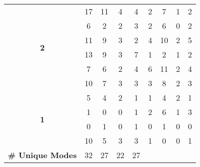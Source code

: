 \begin{table}[!htbp]
\begin{adjustbox}{angle=90}
\begin{tabular}{ccccccccc}
			\multicolumn{1}{c|}{\multirow{6}{*}{\textbf{2}}} & \multicolumn{1}{c|}{17} & \multicolumn{1}{c|}{11} & \multicolumn{1}{c|}{4} & \multicolumn{1}{c|}{4} & \multicolumn{1}{c|}{2} & \multicolumn{1}{c|}{7} & \multicolumn{1}{c|}{1} & 2 \\
			\multicolumn{1}{c|}{} & \multicolumn{1}{c|}{6} & \multicolumn{1}{c|}{2} & \multicolumn{1}{c|}{2} & \multicolumn{1}{c|}{3} & \multicolumn{1}{c|}{2} & \multicolumn{1}{c|}{6} & \multicolumn{1}{c|}{0} & 2 \\
			\multicolumn{1}{c|}{} & \multicolumn{1}{c|}{11} & \multicolumn{1}{c|}{9} & \multicolumn{1}{c|}{3} & \multicolumn{1}{c|}{2} & \multicolumn{1}{c|}{4} & \multicolumn{1}{c|}{10} & \multicolumn{1}{c|}{2} & 5 \\
			\multicolumn{1}{c|}{} & \multicolumn{1}{c|}{13} & \multicolumn{1}{c|}{9} & \multicolumn{1}{c|}{3} & \multicolumn{1}{c|}{7} & \multicolumn{1}{c|}{1} & \multicolumn{1}{c|}{2} & \multicolumn{1}{c|}{1} & 2 \\
			\multicolumn{1}{c|}{} & \multicolumn{1}{c|}{7} & \multicolumn{1}{c|}{6} & \multicolumn{1}{c|}{2} & \multicolumn{1}{c|}{4} & \multicolumn{1}{c|}{6} & \multicolumn{1}{c|}{11} & \multicolumn{1}{c|}{2} & 4 \\
			\multicolumn{1}{c|}{} & \multicolumn{1}{c|}{10} & \multicolumn{1}{c|}{7} & \multicolumn{1}{c|}{3} & \multicolumn{1}{c|}{3} & \multicolumn{1}{c|}{3} & \multicolumn{1}{c|}{8} & \multicolumn{1}{c|}{2} & 3 \\ \hline
			\multicolumn{1}{c|}{\multirow{4}{*}{\textbf{1}}} & \multicolumn{1}{c|}{5} & \multicolumn{1}{c|}{4} & \multicolumn{1}{c|}{2} & \multicolumn{1}{c|}{1} & \multicolumn{1}{c|}{1} & \multicolumn{1}{c|}{4} & \multicolumn{1}{c|}{2} & 1 \\
			\multicolumn{1}{c|}{} & \multicolumn{1}{c|}{1} & \multicolumn{1}{c|}{0} & \multicolumn{1}{c|}{0} & \multicolumn{1}{c|}{1} & \multicolumn{1}{c|}{2} & \multicolumn{1}{c|}{6} & \multicolumn{1}{c|}{1} & 3 \\
			\multicolumn{1}{c|}{} & \multicolumn{1}{c|}{0} & \multicolumn{1}{c|}{1} & \multicolumn{1}{c|}{0} & \multicolumn{1}{c|}{1} & \multicolumn{1}{c|}{0} & \multicolumn{1}{c|}{1} & \multicolumn{1}{c|}{0} & 0 \\
			\multicolumn{1}{c|}{} & \multicolumn{1}{c|}{10} & \multicolumn{1}{c|}{5} & \multicolumn{1}{c|}{3} & \multicolumn{1}{c|}{3} & \multicolumn{1}{c|}{1} & \multicolumn{1}{c|}{0} & \multicolumn{1}{c|}{0} & 1 \\ \hline
			\multicolumn{1}{l|}{\textbf{\# Unique Modes}} & \multicolumn{1}{c|}{32} & \multicolumn{1}{c|}{27} & \multicolumn{1}{c|}{22} & \multicolumn{1}{c|}{27} & \multicolumn{1}{l|}{} & \multicolumn{1}{l|}{} & \multicolumn{1}{l|}{} & \multicolumn{1}{l}{} \\

\end{tabular}
\end{adjustbox}
\end{table}
